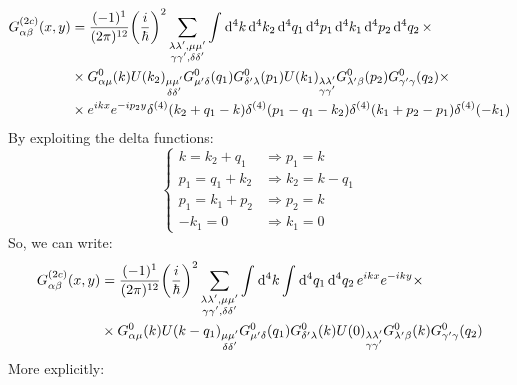 \documentclass[11pt, a4paper, twoside, openright]{article}
\begin{document}
\begin{equation*}
\begin{split}
  G_{\alpha \beta }^{(2c)} (x,y) &= \frac{(-1)^1}{(2 \pi )^{12}} \qty(\frac{i}{\hbar })^2
   \sum_{\substack{\lambda \lambda', \mu \mu' \\ \gamma \gamma', \delta \delta'   } }^{} \int_{}^{} \dd[4]{k} \dd[4]{k_2} \dd[4]{q_1} \dd[4]{p_1} \dd[4]{k_1} \dd[4]{p_2} \dd[4]{q_2}  \times \\
   & \times G^0_{\alpha \mu } (k) U (k_2)_{\substack{ \mu \mu' \\ \delta \delta'} } G^0_{\mu' \delta } (q_1) G^0_{\delta' \lambda  } (p_1) U (k_1)_{\substack{ \lambda \lambda' \\ \gamma \gamma'} } G^0_{\lambda' \beta  } (p_2) G^0_{\gamma' \gamma  } (q_2) \times \\
   & \times e^{i k x} e^{-i p_2 y }
   \delta ^{(4)} (k_2+q_1-k) \delta ^{(4)} (p_1-q_1-k_2) \delta ^{(4)} (k_1+p_2-p_1) \delta ^{(4)} (-k_1)
\end{split}
\end{equation*}
By exploiting the delta functions:
\begin{equation*}
  \begin{cases}
   k = k_2 + q_1 & \Rightarrow p_1 = k \\
   p_1 = q_1 + k_2 & \Rightarrow  k_2 = k - q_1 \\
   p_1 = k_1 + p_2 & \Rightarrow  p_2 = k \\
   -k_1 = 0 & \Rightarrow k_1=0
  \end{cases}
\end{equation*}
So, we can write:
\begin{equation*}
\begin{split}
  G_{\alpha \beta }^{(2c)} (x,y) &= \frac{(-1)^1}{(2 \pi )^{12}} \qty(\frac{i}{\hbar })^2
   \sum_{\substack{\lambda \lambda', \mu \mu' \\ \gamma \gamma', \delta \delta'   } }^{} \int_{}^{} \dd[4]{k} \int_{}^{} \dd[4]{q_1} \dd[4]{q_2}  e^{i k x} e^{-i k y } \times \\
   &
   \times G^0_{\alpha \mu } (k) U (k-q_1)_{\substack{ \mu \mu' \\ \delta \delta'} } G^0_{\mu' \delta } (q_1) G^0_{\delta' \lambda  } (k) U (0)_{\substack{ \lambda \lambda' \\ \gamma \gamma'} } G^0_{\lambda' \beta  } (k) G^0_{\gamma' \gamma  } (q_2)
\end{split}
\end{equation*}
More explicitly:
\end{document}

